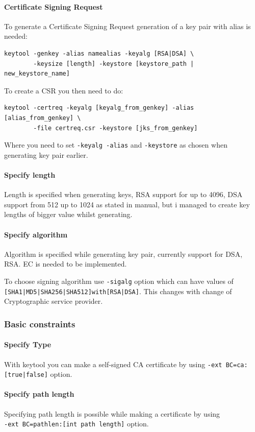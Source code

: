 \documentclass[10pt, a4paper]{report}
\begin{document}
      \paragraph{Certificate Signing Request}
To generate a Certificate Signing Request generation of a key pair with alias is needed:
\begin{verbatim}
keytool -genkey -alias namealias -keyalg [RSA|DSA] \
        -keysize [length] -keystore [keystore_path | new_keystore_name]
\end{verbatim}
To create a CSR you then need to do:
\begin{verbatim}
keytool -certreq -keyalg [keyalg_from_genkey] -alias [alias_from_genkey] \
        -file certreq.csr -keystore [jks_from_genkey]
\end{verbatim}
Where you need to set \verb+-keyalg -alias+ and \verb+-keystore+ as chosen when generating key pair earlier.

      \paragraph{Specify length}
Length is specified when generating keys, RSA support for up to 4096, DSA support from 512 up to 1024 as stated in manual, but i managed to create key lengths of bigger value whilst generating.

      \paragraph{Specify algorithm}
Algorithm is specified while generating key pair, currently support for DSA, RSA. EC is needed to be implemented.      

To choose signing algorithm use \verb+-sigalg+ option which can have values of \verb+[SHA1|MD5|SHA256|SHA512]with[RSA|DSA]+. This changes with change of Cryptographic service provider.
    \subsubsection{Basic constraints}
    
      \paragraph{Specify Type}
With keytool you can make a self-signed CA certificate by using \verb+-ext BC=ca:[true|false]+ option.

      \paragraph{Specify path length}
Specifying path length is possible while making a certificate by using  \\
\verb+-ext BC=pathlen:[int path length]+ option.
\end{document}

